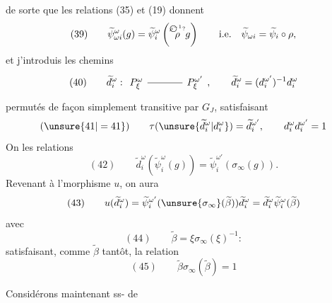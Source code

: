 de sorte que les relations (35) et (19) donnent
\[
(39)\qquad \widetilde\psi_{\omega i}^\omega(g)=\widetilde\psi_i^\omega\left(\overset{\text{\textcircled{$\scriptstyle\rho^{-1}?$}}}{\rho}g\right)
\qquad\text{i.e.}\quad\widetilde\psi_{\omega i}=\widetilde\psi_i\circ\rho,
\]
et j'introduis les chemins
\[
(40)\qquad\widetilde d_i^\omega:
\begin{tikzcd}[ampersand replacement=\&,column sep=large]
P_\xi^\omega\arrow[r,no head]\&P_\xi^{\omega'}
\end{tikzcd},\qquad
\widetilde d_i^\omega=(d_i^{\omega'})^{-1}d_i^\omega
\]
permutés de façon simplement transitive par $G_J$,
 satisfaisant
\[
(\unsure{41|=41})\qquad\tau(\unsure{\widetilde d_i^\omega|d_i^\omega})=\widetilde d_i^{\omega'},\qquad
d_i^\omega d_i^{\omega'}=1
\]
On   les relations
\[
(42)\qquad\widetilde d_i^\omega(\widetilde\psi_i^\omega(g))=
\widetilde\psi_i^{\omega'}(\sigma_\infty(g)).
\]
Revenant à l'morphisme $u$, on aura 
\[
(43)\qquad u(\widetilde d_i^\omega)=\widetilde\psi_i^{\omega'}(\unsure{\sigma_\infty}(\widetilde\beta))\widetilde d_i^\omega
=\widetilde d_i^\omega\widetilde\psi_i^\omega(\widetilde\beta)
\]
avec
\[
(44)\qquad\widetilde\beta=\xi\sigma_\infty(\xi)^{-1}:
\]
satisfaisant,   comme $\widetilde\beta$ tantôt, la relation
\[
(45)\qquad\widetilde\beta\sigma_\infty(\widetilde\beta)=1
\]

Considérons maintenant  ss- de

